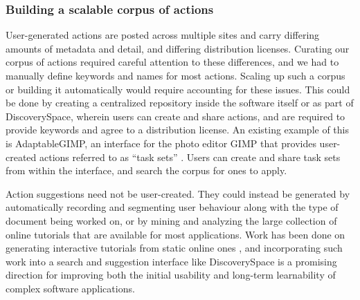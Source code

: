 \subsubsection{Building a scalable corpus of actions}
User-generated actions are posted across multiple sites and carry differing amounts of metadata and detail, and differing distribution licenses. Curating our corpus of actions required careful attention to these differences, and we had to manually define keywords and names for most actions. Scaling up such a corpus or building it automatically would require accounting for these issues. This could be done by creating a centralized repository inside the software itself or as part of Discovery\-Space, wherein users can create and share actions, and are required to provide keywords and agree to a distribution license. An existing example of this is AdaptableGIMP, an interface for the photo editor GIMP that provides user-created actions referred to as ``task sets'' \cite{Lafreniere2011}. Users can create and share task sets from within the interface, and search the corpus for ones to apply.

Action suggestions need not be user-created. They could instead be generated by automatically recording and segmenting user behaviour along with the type of document being worked on, or by mining and analyzing the large collection of online tutorials that are available for most applications. Work has been done on generating interactive tutorials from static online ones \cite{Fourney2014Mining, Laput2012}, and incorporating such work into a search and suggestion interface like Discovery\-Space is a promising direction for improving both the initial usability and long-term learnability of complex software applications.
